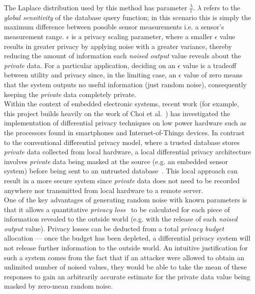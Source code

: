\documentclass[12pt]{article}
\begin{document}
    The Laplace distribution used by this method has parameter $\frac{\lambda}{\epsilon}$. $\lambda$ refers to the \textit{global sensitivity} of the database query function; in this scenario this is simply the maximum difference between possible sensor measurements i.e. a sensor's measurement range. $\epsilon$ is a privacy scaling parameter, where a smaller $\epsilon$ value results in greater privacy by applying noise with a greater variance, thereby reducing the amount of information each \textit{noised output} value reveals about the \textit{private} data. For a particular application, deciding on an $\epsilon$ value is a tradeoff between utility and privacy since, in the limiting case, an $\epsilon$ value of zero means that the system outputs no useful information (just random noise), consequently keeping the \textit{private} data completely private.\\

    Within the context of embedded electronic systems, recent work (for example, this project builds heavily on the work of Choi et al.~\cite{Choi2018GuaranteeingLD}) has investigated the implementation of differential privacy techniques on low power hardware such as the processors found in smartphones and Internet-of-Things devices. In contrast to the conventional differential privacy model, where a trusted database stores \textit{private} data collected from local hardware, a local differential privacy architecture involves \textit{private} data being masked at the source (e.g. an embedded sensor system) before being sent to an untrusted database~\cite{Kairouz:2014}. This local approach can result in a more secure system since \textit{private} data does not need to be recorded anywhere nor transmitted from local hardware to a remote server.\\

    One of the key advantages of generating random noise with known parameters is that it allows a quantitative \textit{privacy loss}~\cite{Choi2018GuaranteeingLD} to be calculated for each piece of information revealed to the outside world (e.g. with the release of each \textit{noised output} value). Privacy losses can be deducted from a total \textit{privacy budget} allocation --- once the budget has been depleted, a differential privacy system will not release further information to the outside world. An intuitive justification for such a system comes from the fact that if an attacker were allowed to obtain an unlimited number of noised values, they would be able to take the mean of these responses to gain an arbitrarily accurate estimate for the private data value being masked by zero-mean random noise.\\
\end{document}
